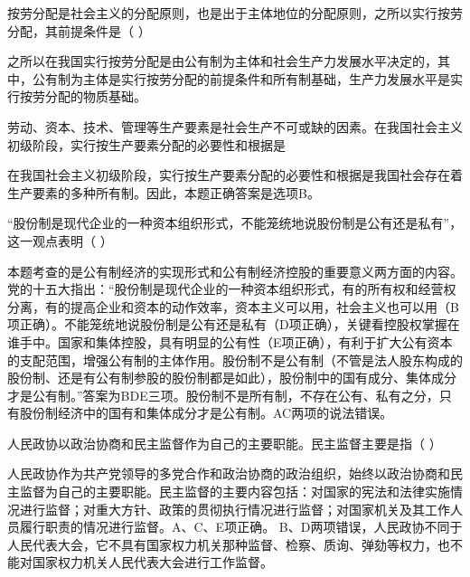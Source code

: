 \question 按劳分配是社会主义的分配原则，也是出于主体地位的分配原则，之所以实行按劳分配，其前提条件是（
）
\par{}
\begin{solution}之所以在我国实行按劳分配是由公有制为主体和社会生产力发展水平决定的，其中，公有制为主体是实行按劳分配的前提条件和所有制基础，生产力发展水平是实行按劳分配的物质基础。
\end{solution}
\question 劳动、资本、技术、管理等生产要素是社会生产不可或缺的因素。在我国社会主义初级阶段，实行按生产要素分配的必要性和根据是
\par{}
\begin{solution}在我国社会主义初级阶段，实行按生产要素分配的必要性和根据是我国社会存在着生产要素的多种所有制。因此，本题正确答案是选项B。
\end{solution}
\question ``股份制是现代企业的一种资本组织形式，不能笼统地说股份制是公有还是私有''，这一观点表明（
）
\par{}
\begin{solution}本题考查的是公有制经济的实现形式和公有制经济控股的重要意义两方面的内容。党的十五大指出：``股份制是现代企业的一种资本组织形式，有的所有权和经营权分离，有的提高企业和资本的动作效率，资本主义可以用，社会主义也可以用（B项正确）。不能笼统地说股份制是公有还是私有（D项正确），关键看控股权掌握在谁手中。国家和集体控股，具有明显的公有性（E项正确），有利于扩大公有资本的支配范围，增强公有制的主体作用。股份制不是公有制（不管是法人股东构成的股份制、还是有公有制参股的股份制都是如此），股份制中的国有成分、集体成分才是公有制。''答案为BDE三项。股份制不是所有制，不存在公有、私有之分，只有股份制经济中的国有和集体成分才是公有制。AC两项的说法错误。
\end{solution}
\question 人民政协以政治协商和民主监督作为自己的主要职能。民主监督主要是指（ ）
\par{}
\begin{solution}人民政协作为共产党领导的多党合作和政治协商的政治组织，始终以政治协商和民主监督为自己的主要职能。民主监督的主要内容包括：对国家的宪法和法律实施情况进行监督；对重大方针、政策的贯彻执行情况进行监督；对国家机关及其工作人员履行职责的情况进行监督。A、C、E项正确。
B、D两项错误，人民政协不同于人民代表大会，它不具有国家权力机关那种监督、检察、质询、弹劾等权力，也不能对国家权力机关人民代表大会进行工作监督。
\end{solution}
